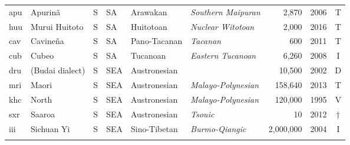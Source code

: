 \begin{table}
\begin{tabularx}{\textwidth}{lQllQQrlc}
 apu & {{Apurinã}} & S & SA & {Arawakan} & {\textit{Southern Maipuran}} &  2,870 & 2006 & T\\
 huu & {{Murui Huitoto}} & S & SA & {Huitotoan} & {\textit{Nuclear Witotoan}} &  2,000 & 2016 & T\\
 cav & {{Cavineña}} & S & SA & {Pano-Tacanan} & {\textit{Tacanan}} &  600 & 2011 & T\\
 cub & {{Cubeo}} & S & SA & {Tucanoan} & {\textit{Eastern Tucanoan}} &  6,260 & 2008 & I\\
 dru & {{ (Budai dialect)}} & S & SEA & {Austronesian} &  &  10,500 & 2002 & D\\
 mri & {{Maori}} & S & SEA  & {Austronesian} & {\textit{Malayo-Polynesian}} &  158,640 & 2013 & T\\
 khc & {{ North}} & S & SEA  & {Austronesian} & {\textit{Malayo-Polynesian}} &  120,000 & 1995 & V\\
 sxr & {{Saaroa}} & S & SEA  & {Austronesian} & {\textit{Tsouic}} &  10 & 2012 & †\\
 iii & {{Sichuan Yi}} & S & SEA & {Sino-Tibetan} & {\textit{Burmo-Qiangic}} &  2,000,000 & 2004 & I\\
 \lspbottomrule
\end{tabularx}
\end{table}


